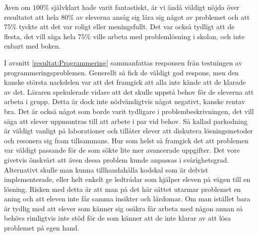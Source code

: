 \textcolor{lila}{Även om $100\%$ självklart hade varit fantastiskt, är vi ändå väldigt nöjda över resultatet att hela $80\%$ av eleverna ansåg sig lära sig något av problemet och att $75\%$ tyckte att det var roligt eller meningsfullt. Det var också tydligt att de flesta, det vill säga hela $75\%$ ville arbeta med problemlösning i skolan, och inte enbart med boken.}

\textcolor{Mahogany}{I avsnitt \ref{resultat:Programmering} sammanfattas responsen från testningen av programmeringsproblemen. Generellt så fick de väldigt god respons, men den kanske största nackdelen var att det framgick att alla inte kände att de klarade av det. Läraren spekulerade vidare att det skulle uppstå behov för de eleverna att arbeta i grupp. Detta är dock inte nödvändigtvis något negativt, kanske rentav bra. Det är också något som borde varit tydligare i problembeskrivningen, det vill säga att elever uppmuntras till att arbete i par vid behov. Så kallad parkodning är väldigt vanligt på laborationer och tillåter elever att diskutera lösningsmetoder och resonera sig fram tillsammans. Hur som helst så framgick det att problemen var väldigt passande för de som sökte lite mer avancerade uppgifter. Det vore givetvis önskvärt att även dessa problem kunde anpassas i svårighetsgrad. Alternativt skulle man kunna tillhandahålla kodskal som är delvist implementerade, eller helt enkelt ge ledtrådar som hjälper eleven på vägen till en lösning. Risken med detta är att man på det här sättet utarmar problemet en aning och att eleven inte får samma insikter och lärdomar. Om man istället bara är tydlig med att elever som känner sig osäkra får arbeta med någon annan så behövs rimligtvis inte stöd för de som känner att de inte klarar av att lösa problemet på egen hand.}